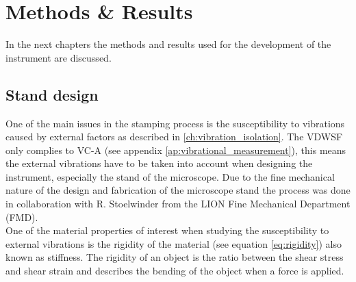\documentclass[10pt]{article}
\begin{document}



\section{Methods \& Results}
In the next chapters the methods and results used for the development of the instrument are discussed.

\subsection{Stand design}
One of the main issues in the stamping process is the susceptibility to vibrations caused by external factors as described in \ref{ch:vibration_isolation}.
The VDWSF only complies to VC-A (see appendix \ref{ap:vibrational_measurement}), this means the external vibrations have to be taken into account when designing the instrument, especially the stand of the microscope. 
Due to the fine mechanical nature of the design and fabrication of the microscope stand the process was done in collaboration with R. Stoelwinder from the LION Fine Mechanical Department (FMD).\\

One of the material properties of interest when studying the susceptibility to external vibrations is the rigidity of the material (see equation \ref{eq:rigidity}) also known as stiffness. 
The rigidity of an object is the ratio between the shear stress and shear strain and describes the bending of the object when a force is applied.

\end{document}
